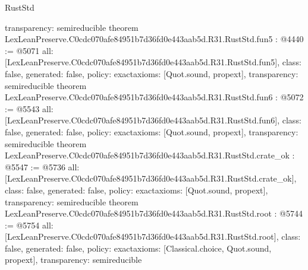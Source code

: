 \begin{lexlean}{RustStd}
\begin{coremodule}
{  transparency: semireducible
}
theorem LexLeanPreserve.C0cdc070afe84951b7d36fd0e443aab5d.R31.RustStd.fun5 : @4440 := @5071 {
  all: [LexLeanPreserve.C0cdc070afe84951b7d36fd0e443aab5d.R31.RustStd.fun5],
  class: false,
  generated: false,
  policy: exact{axioms: [Quot.sound, propext]},
  transparency: semireducible
}
theorem LexLeanPreserve.C0cdc070afe84951b7d36fd0e443aab5d.R31.RustStd.fun6 : @5072 := @5543 {
  all: [LexLeanPreserve.C0cdc070afe84951b7d36fd0e443aab5d.R31.RustStd.fun6],
  class: false,
  generated: false,
  policy: exact{axioms: [Quot.sound, propext]},
  transparency: semireducible
}
theorem LexLeanPreserve.C0cdc070afe84951b7d36fd0e443aab5d.R31.RustStd.crate_ok : @5547 := @5736 {
  all: [LexLeanPreserve.C0cdc070afe84951b7d36fd0e443aab5d.R31.RustStd.crate_ok],
  class: false,
  generated: false,
  policy: exact{axioms: [Quot.sound, propext]},
  transparency: semireducible
}
theorem LexLeanPreserve.C0cdc070afe84951b7d36fd0e443aab5d.R31.RustStd.root : @5744 := @5754 {
  all: [LexLeanPreserve.C0cdc070afe84951b7d36fd0e443aab5d.R31.RustStd.root],
  class: false,
  generated: false,
  policy: exact{axioms: [Classical.choice, Quot.sound, propext]},
  transparency: semireducible
}


\end{coremodule}
\end{lexlean}
